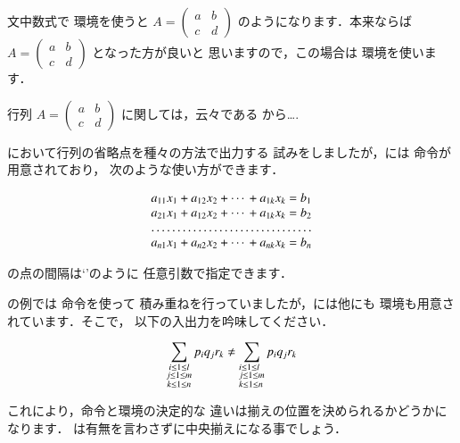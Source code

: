 文中数式で  環境を使うと
 $A = \left(\begin{matrix} a & b\\ c & d\end{matrix} \right)$
のようになります．本来ならば $A = \left(\begin{smallmatrix}
  a & b\\ c & d\end{smallmatrix}\right)$ となった方が良いと
思いますので，この場合は  環境を使います．

\begin{InOut}
行列 $A = \left(\begin{smallmatrix}
  a & b\\ c & d\end{smallmatrix}
\right)$ に関しては，云々である
から\ldots.
\end{InOut}

\begin{Exe}
において行列の省略点を種々の方法で出力する
試みをしましたが，\AmSLaTeX には 命令が用意されており，
次のような使い方ができます．

\begin{InOut}
\begin{displaymath}
 \begin{array}{*{2}{c@{\:+\:}}%
   @{\cdots\:+\:}c@{\;=\;}c}
 a_{11}x_1 & a_{12}x_2 & a_{1k}x_k
    & b_1\\
 a_{21}x_1 & a_{12}x_2 & a_{1k}x_k
    & b_2\\
 \hdotsfor{4}\\
 a_{n1}x_1 & a_{n2}x_2 & a_{nk}x_k
   & b_n\\
 \end{array}
\end{displaymath}
\end{InOut}
 
 の点の間隔は`'のように
任意引数で指定できます．
\end{Exe}

\begin{Prob}
の例では 命令を使って
積み重ねを行っていましたが，には他にも
環境も用意されています．そこで，
以下の入出力を吟味してください．

\begin{InOut}
\begin{displaymath}
\sum_{\substack{i\le 1\le l \\ j\le 1 
 \le m\\ k\le 1 \le n}} p_i q_j r_k \neq
 \sum_{\begin{subarray}{l} 
   i\le 1\le l \\ j\le 1 \le m  \\ 
  k\le 1 \le n\end{subarray}} 
  p_i q_j r_k 
\end{displaymath}  
\end{InOut} 

これにより，命令と環境の決定的な
違いは揃えの位置を決められるかどうかになります．
は有無を言わさずに中央揃えになる事でしょう．
\end{Prob}


